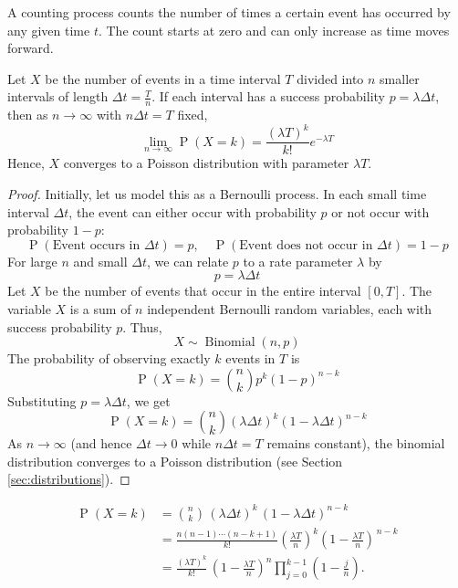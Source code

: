 \documentclass[11pt, headings=standardclasses, parskip=half, twoside]{scrartcl}
\newcommand{\Prob}{\operatorname{P}}
\begin{document}
A counting process counts the number of times a certain event has occurred by any given time \(t\). 
The count starts at zero and can only increase as time moves forward.

\begin{theorem}\label{thm:binomial_to_poisson}
  Let \(X\) be the number of events in a time interval \(T\) divided into \(n\) smaller intervals of length \(\Delta t =\frac{T}{n}\).
  If each interval has a success probability \(p=\lambda \Delta t\), then as \(n \to \infty\) with \(n \Delta t = T\) fixed,
  \[
  \lim_{n \to \infty} \Prob(X=k) = \frac{(\lambda T)^k}{k!} e^{-\lambda T}
  \]
  Hence, \(X\) converges to a Poisson distribution with parameter \(\lambda T\).
\end{theorem}
\begin{proof}
Initially, let us model this as a Bernoulli process. 
In each small time interval $\Delta t$, the event can either occur with probability $p$ or not occur with probability $1-p$:
$$
\Prob(\text{Event occurs in } \Delta t)=p, \quad \Prob(\text{Event does not occur in } \Delta t)=1-p
$$
For large $n$ and small $\Delta t$, we can relate $p$ to a rate parameter $\lambda$ by
$$
p=\lambda \Delta t
$$
Let $X$ be the number of events that occur in the entire interval $[0, T]$. 
The variable $X$ is a sum of $n$ independent Bernoulli random variables, each with success probability $p$. 
Thus,
$$
X \sim \operatorname{Binomial}(n, p)
$$
The probability of observing exactly $k$ events in $T$ is
$$
\Prob(X=k)=\binom{n}{k} p^k(1-p)^{n-k}
$$
Substituting $p=\lambda \Delta t$, we get
$$
\Prob(X=k)=\binom{n}{k}(\lambda \Delta t)^k(1-\lambda \Delta t)^{n-k}
$$
As $n \rightarrow \infty$ (and hence $\Delta t \rightarrow 0$ while $n \Delta t=T$ remains constant), the binomial distribution converges to a Poisson distribution (see Section \ref{sec:distributions}).
\end{proof}
\[
\begin{aligned}
\Prob(X = k) &= \binom{n}{k}\,(\lambda\Delta t)^k\,(1-\lambda\Delta t)^{n-k}\\
            &= \frac{n(n-1)\cdots(n-k+1)}{k!}
               \left(\frac{\lambda T}{n}\right)^k
               \left(1-\frac{\lambda T}{n}\right)^{\,n-k}\\[4pt]
            &= \frac{(\lambda T)^k}{k!}\,
               \left(1-\frac{\lambda T}{n}\right)^{n}\!
               \prod_{j=0}^{k-1}\!\left(1-\frac{j}{n}\right).
\end{aligned}
\]
\end{document}
